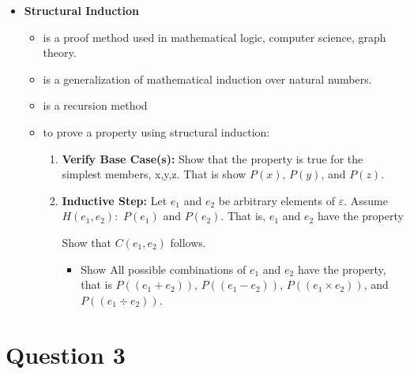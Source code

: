 \documentclass[12pt]{article}
\begin{document}
\begin{itemize}
    \item \textbf{Structural Induction}
    \begin{itemize}
        \item is a proof method used in mathematical logic, computer science, graph theory.
        \item is a generalization of mathematical induction over natural numbers.
        \item is a recursion method
        \item to prove a property using structural induction:

        \begin{enumerate}[1.]
            \item \textbf{Verify Base Case(s):} Show that the property is true for the
            simplest members, {x,y,z}. That is show $P(x)$, $P(y)$, and $P(z)$.
            \item \textbf{Inductive Step:} Let $e_1$ and $e_2$ be arbitrary elements of $\varepsilon$.
            Assume $H({e_1,e_2}):$ $P(e_1)$ and $P(e_2)$. That is, $e_1$ and $e_2$
            have the property

            \bigskip

            Show that $C({e_1,e_2})$ follows.
            \begin{itemize}
                \item Show All possible combinations of $e_1$ and $e_2$ have the
                property, that is $P((e_1 + e_2))$, $P((e_1 - e_2))$, $P((e_1 \times e_2))$,
                and $P((e_1 \div e_2))$.
            \end{itemize}
        \end{enumerate}
    \end{itemize}
\end{itemize}

\section*{Question 3}
\end{document}
